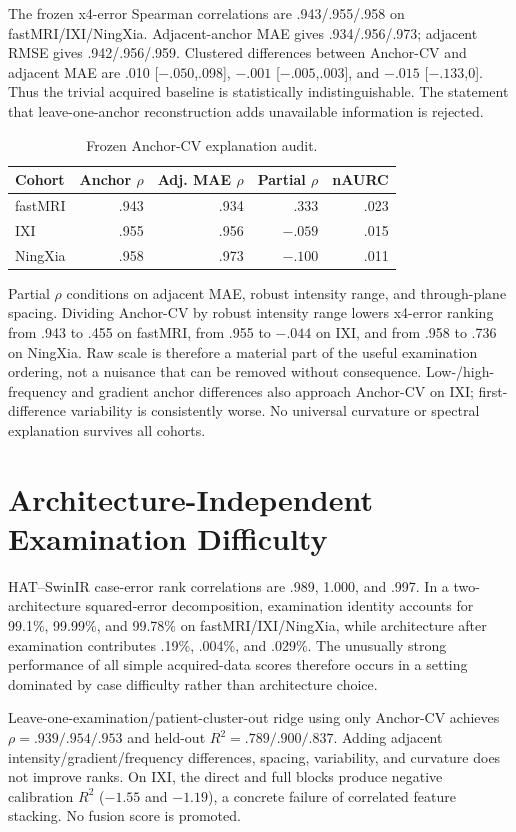 \documentclass[10pt,twocolumn,letterpaper]{article}
\begin{document}
The frozen x4-error Spearman correlations are .943/.955/.958 on fastMRI/IXI/NingXia. Adjacent-anchor MAE gives .934/.956/.973; adjacent RMSE gives .942/.956/.959. Clustered differences between Anchor-CV and adjacent MAE are .010 [$-.050$,.098], $-.001$ [$-.005$,.003], and $-.015$ [$-.133$,0]. Thus the trivial acquired baseline is statistically indistinguishable. The statement that leave-one-anchor reconstruction adds unavailable information is rejected.

\begin{table}[t]
\centering
\caption{Frozen Anchor-CV explanation audit.}
\label{tab:s_anchor}
\setlength{\tabcolsep}{3.2pt}
\begin{tabular}{lrrrr}
\toprule
Cohort&Anchor $\rho$&Adj. MAE $\rho$&Partial $\rho$&nAURC\\
\midrule
fastMRI&.943&.934&.333&.023\\
IXI&.955&.956&$-.059$&.015\\
NingXia&.958&.973&$-.100$&.011\\
\bottomrule
\end{tabular}
\end{table}

Partial $\rho$ conditions on adjacent MAE, robust intensity range, and through-plane spacing. Dividing Anchor-CV by robust intensity range lowers x4-error ranking from .943 to .455 on fastMRI, from .955 to $-.044$ on IXI, and from .958 to .736 on NingXia. Raw scale is therefore a material part of the useful examination ordering, not a nuisance that can be removed without consequence. Low-/high-frequency and gradient anchor differences also approach Anchor-CV on IXI; first-difference variability is consistently worse. No universal curvature or spectral explanation survives all cohorts.

\section{Architecture-Independent Examination Difficulty}
HAT--SwinIR case-error rank correlations are .989, 1.000, and .997. In a two-architecture squared-error decomposition, examination identity accounts for 99.1\%, 99.99\%, and 99.78\% on fastMRI/IXI/NingXia, while architecture after examination contributes .19\%, .004\%, and .029\%. The unusually strong performance of all simple acquired-data scores therefore occurs in a setting dominated by case difficulty rather than architecture choice.

Leave-one-examination/patient-cluster-out ridge using only Anchor-CV achieves $\rho=.939/.954/.953$ and held-out $R^2=.789/.900/.837$. Adding adjacent intensity/gradient/frequency differences, spacing, variability, and curvature does not improve ranks. On IXI, the direct and full blocks produce negative calibration $R^2$ ($-1.55$ and $-1.19$), a concrete failure of correlated feature stacking. No fusion score is promoted.
\end{document}
